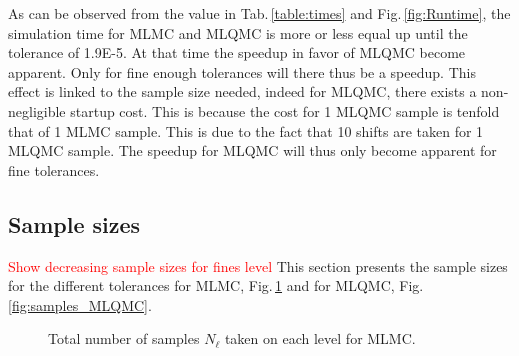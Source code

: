 \documentclass{ICASP13Paper}
\begin{document}
\begin{table}[H]
\caption{Actual simulation time in seconds for MLMC and MLQMC.}
\centering
\label{table:times}
\end{table}

As can be observed from the value in Tab.\,\ref{table:times} and Fig.\,\ref{fig:Runtime}, the simulation time for MLMC and MLQMC is more or less equal up until the tolerance of 1.9E-5. At that time the speedup in favor of MLQMC become apparent. Only for fine enough tolerances will there thus be a speedup. This effect is linked to the sample size needed, indeed for MLQMC, there exists a non-negligible  startup cost. This is because the cost for 1 MLQMC sample is tenfold that of 1 MLMC sample. This is due to the fact that 10 shifts are taken for 1 MLQMC sample. The speedup for MLQMC will thus only become apparent for fine tolerances.

\subsection{Sample sizes}
\textcolor{red}{Show decreasing sample sizes for fines level}
This section presents the sample sizes for the different tolerances for MLMC, Fig.\,\ref{fig:samples_MLMC} and for MLQMC, Fig.\,\ref{fig:samples_MLQMC}.

\begin{figure}[H]
\centering
\scalebox{0.65}{
}
 \caption{Total number of samples $N_\ell$ taken on each level for MLMC.}
 \label{fig:samples_MLMC}
\end{figure}
\end{document}
